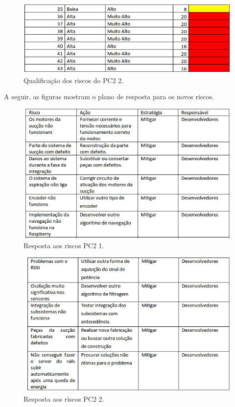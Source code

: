 \begin{figure}[H]
	\centering
	\includegraphics[scale=0.5]{figuras/riscosQualitativopc22.png}
	\caption{Qualificação dos riscos do PC2 2.}
	\label{img:qualitativoriscospc22}
\end{figure}

A seguir, as figuras mostram o plano de resposta para os novos riscos.

\begin{figure}[H]
	\centering
	\includegraphics[scale=0.5]{figuras/riscos_acao_pc2_1.png}
	\caption{Resposta aos riscos PC2 1.}
	\label{img:respostasriscospc21}
\end{figure}

\begin{figure}[H]
	\centering
	\includegraphics[scale=0.5]{figuras/riscos_acao_pc2_2.png}
	\caption{Resposta aos riscos PC2 2.}
	\label{img:respostasriscospc22}
\end{figure}

